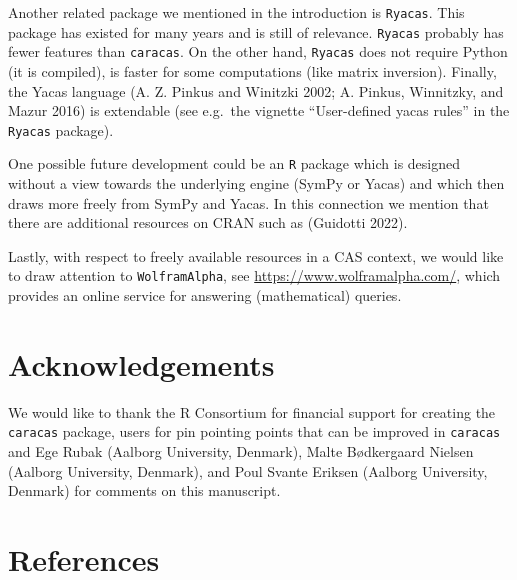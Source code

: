 Another related package we mentioned in the introduction is \texttt{Ryacas}.
This package has existed for many years and is still of relevance.
\texttt{Ryacas} probably has fewer features than \texttt{caracas}. On the other
hand, \texttt{Ryacas} does not require Python (it is compiled), is faster for
some computations (like matrix inversion). Finally, the Yacas language
(A. Z. Pinkus and Winitzki 2002; A. Pinkus, Winnitzky, and Mazur 2016) is extendable (see e.g.~the vignette
``User-defined yacas rules'' in the \texttt{Ryacas} package).

One possible future development could be an \texttt{R} package which is
designed without a view towards the underlying engine (SymPy or Yacas)
and which then draws more freely from SymPy and Yacas.
In this connection we mention that there are additional resources
on CRAN such as  (Guidotti 2022).

Lastly, with respect to freely available resources in a CAS context, we would
like to draw attention to \texttt{WolframAlpha}, see
\url{https://www.wolframalpha.com/}, which provides an online service for
answering (mathematical) queries.

\hypertarget{acknowledgements}{%
\section{Acknowledgements}\label{acknowledgements}}

We would like to thank the R Consortium for financial support for
creating the \texttt{caracas} package, users for pin pointing points
that can be improved in \texttt{caracas} and Ege Rubak (Aalborg
University, Denmark), Malte Bødkergaard Nielsen (Aalborg
University, Denmark), and Poul Svante Eriksen (Aalborg
University, Denmark)
for comments on this manuscript.

\hypertarget{references}{%
\section*{References}\label{references}}

